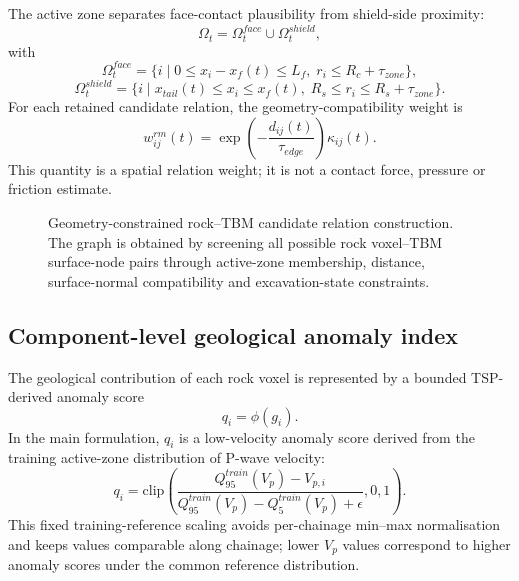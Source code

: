 The active zone separates face-contact plausibility from shield-side proximity:
\begin{equation}
\Omega_t=\Omega_t^{face}\cup\Omega_t^{shield},
\end{equation}
with
\begin{equation}
\Omega_t^{face}=\{i\mid 0\leq x_i-x_f(t)\leq L_f,\; r_i\leq R_c+\tau_{zone}\},
\end{equation}
\begin{equation}
\Omega_t^{shield}=\{i\mid x_{tail}(t)\leq x_i\leq x_f(t),\; R_s\leq r_i\leq R_s+\tau_{zone}\}.
\end{equation}
For each retained candidate relation, the geometry-compatibility weight is
\begin{equation}
w_{ij}^{rm}(t)=\exp\left(-\frac{d_{ij}(t)}{\tau_{edge}}\right)\kappa_{ij}(t).
\end{equation}
This quantity is a spatial relation weight; it is not a contact force, pressure or friction estimate.

\begin{figure}[!htbp]
\centering
{}
\caption{Geometry-constrained rock--TBM candidate relation construction. The graph is obtained by screening all possible rock voxel--TBM surface-node pairs through active-zone membership, distance, surface-normal compatibility and excavation-state constraints.}
\label{fig:construction}
\end{figure}

\subsection{Component-level geological anomaly index}
The geological contribution of each rock voxel is represented by a bounded TSP-derived anomaly score
\begin{equation}
q_i=\phi(g_i).
\end{equation}
In the main formulation, $q_i$ is a low-velocity anomaly score derived from the training active-zone distribution of P-wave velocity:
\begin{equation}
q_i=\mathrm{clip}\left(\frac{Q_{95}^{train}(V_p)-V_{p,i}}{Q_{95}^{train}(V_p)-Q_{5}^{train}(V_p)+\epsilon},0,1\right).
\end{equation}
This fixed training-reference scaling avoids per-chainage min--max normalisation and keeps values comparable along chainage; lower $V_p$ values correspond to higher anomaly scores under the common reference distribution.

